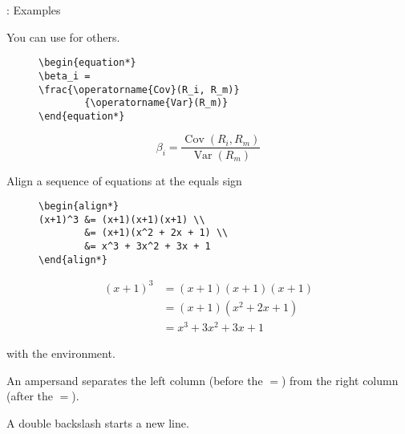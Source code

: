 \begin{frame}{\insertsubsection{}: Examples}
\begin{itemize}
{\small 
        \item You can use  for others.
              \begin{figure}
                  \begin{minipage}{0.35\textwidth}
                      \begin{lstlisting}[basicstyle=\tiny]
\begin{equation*}
\beta_i =
\frac{\operatorname{Cov}(R_i, R_m)}
        {\operatorname{Var}(R_m)}
\end{equation*}
        \end{lstlisting}
                  \end{minipage}
                  \begin{minipage}{0.4\textwidth}
                      \begin{equation*}
                          \beta_i =
                          \frac{\operatorname{Cov}(R_i, R_m)}
                          {\operatorname{Var}(R_m)}
                      \end{equation*}
                  \end{minipage}
              \end{figure}

        \item Align a sequence of equations at the equals sign
            \begin{figure}
                \begin{minipage}{0.4\textwidth}
                    \begin{lstlisting}[basicstyle=\scriptsize]
\begin{align*}
(x+1)^3 &= (x+1)(x+1)(x+1) \\
        &= (x+1)(x^2 + 2x + 1) \\
        &= x^3 + 3x^2 + 3x + 1
\end{align*}
        \end{lstlisting}
                \end{minipage}
                \begin{minipage}{0.4\textwidth}
                    \begin{align*}
                        (x+1)^3 & = (x+1)(x+1)(x+1)     \\
                                & = (x+1)(x^2 + 2x + 1) \\
                                & = x^3 + 3x^2 + 3x + 1
                    \end{align*}
                \end{minipage}
            \end{figure}
        with the  environment.

        \item An ampersand \keystrokebftt{\&} separates the left column (before the $=$) from the right column (after the $=$).
        \item A double backslash \keystrokebftt{\bs}\keystrokebftt{\bs} starts a new line.
              
        }
    \end{itemize}
\end{frame}